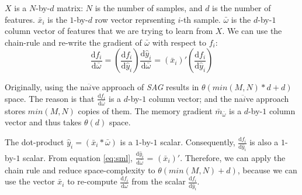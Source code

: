 $X$ is a $N$-by-$d$ matrix: $N$ is the number of samples, and $d$ is the number of features.  
$\bar{x}_{i}$ is the $1$-by-$d$ row vector reprsenting $i$-th sample.
$\bar{\omega}$ is the $d$-by-$1$ column vector of features that we are trying to learn from $X$.
We can use the chain-rule and re-write the gradient of $\bar{\omega}$ with respect to $f_{i}$:
\begin{equation} \label{eq:chainsml}
\frac{\text{d}f_{i}}{\text{d}\bar{\omega}} = \left(\frac{\text{d}f_{i}}{\text{d}\hat{y}_{i}}\right)\frac{\text{d}\hat{y}_{i}}{\text{d}\bar{\omega}} = \left(\bar{x}_{i}\right)'\left(\frac{\text{d}f_{i}}{\text{d}\hat{y}_{i}}\right)
\end{equation}

Originally, using the na$\ddot{i}$ve approach of \emph{SAG} results in $\theta(min(M,N)*d+d)$ space.
The reason is that $\frac{\text{d}f_{i}}{\text{d}\bar{\omega}}$ is a $d$-by-$1$ column vector; and the na$\ddot{i}$ve approach stores $min(M,N)$ copies of them.  
The memory gradient $\bar{m}_{\bar{\omega}}$ is a $d$-by-$1$ column vector and thus takes $\theta(d)$ space.

The dot-product $\hat{y}_{i} = \left(\bar{x}_{i}*\bar{\omega}\right)$ is a $1$-by-$1$ scalar.  
Consequently, $\frac{\text{d}f_{i}}{\text{d}\hat{y}_{i}}$ is also a $1$-by-$1$ scalar.  
From equation \ref{eq:sml}, $\frac{\text{d}\hat{y}_{i}}{\text{d}\bar{\omega}}$ = $\left(\bar{x}_i\right)'$.
Therefore, we can apply the chain rule and reduce space-complexity to $\theta(min(M,N)+d)$, because we can use the vector $\bar{x}_{i}$ to re-compute $\frac{\text{d}f_{i}}{\text{d}\bar{\omega}}$ from the scalar $\frac{\text{d}f_{i}}{\text{d}\hat{y}_{i}}$.

